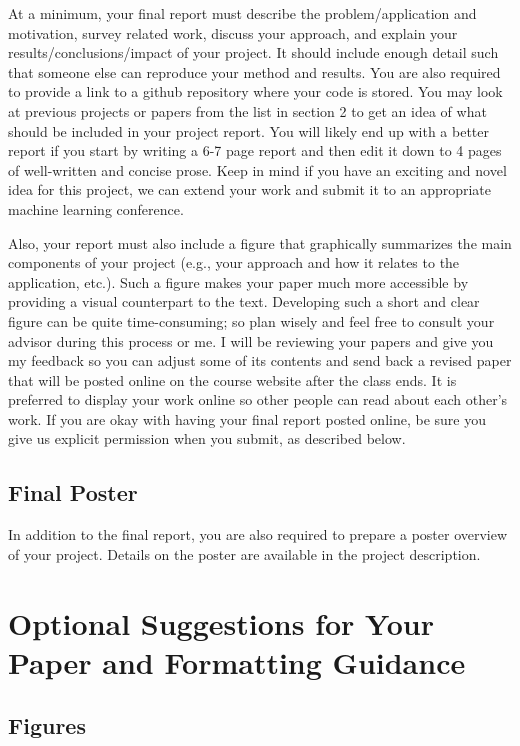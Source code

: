 \documentclass{article}
\begin{document}
At a minimum, your final report must describe the problem/application and motivation, survey related work, discuss your approach, and explain your results/conclusions/impact of your project. It should include enough detail such that someone else can reproduce your method and results. You are also required to provide a link to a github repository where your code is stored. You may look at previous projects or papers from the list in section 2 to get an idea of what should be included in your project report. You will likely end up with a better report if you start by writing a 6-7 page report and then edit it down to 4 pages of well-written and concise prose. Keep in mind if you have an exciting and novel idea for this project, we can extend your work and submit it to an appropriate machine learning conference. 

Also, your report must also include a figure that graphically summarizes the main components of your project (e.g., your approach and how it relates to the application, etc.). Such a figure makes your paper much more accessible by providing a visual counterpart to the text. Developing such a short and clear figure can be quite time-consuming; so plan wisely and feel free to consult your advisor during this process or me. I will be reviewing your papers and give you my feedback so you can adjust some of its contents and send back a revised paper that will be posted online on the course website after the class ends. It is preferred to display your work online so other people can read about each other's work. If you are okay with having your final report posted online, be sure you give us explicit permission when you submit, as described below.

\subsection{Final Poster}

In addition to the final report, you are also required to prepare a poster overview of your project. Details on the poster are available in the project description.

\section{Optional Suggestions for Your Paper and Formatting Guidance} 

\subsection{Figures}
 
\end{document}
